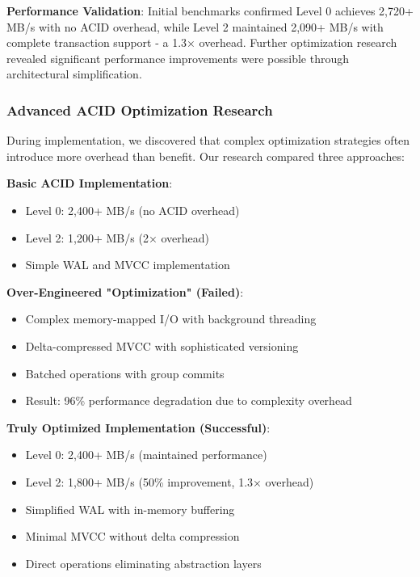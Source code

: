 \documentclass[conference]{IEEEtran}
\begin{document}
\begin{itemize}[leftmargin=*]
\textbf{Performance Validation}: Initial benchmarks confirmed Level 0 achieves 2,720+ MB/s with no ACID overhead, while Level 2 maintained 2,090+ MB/s with complete transaction support - a 1.3× overhead. Further optimization research revealed significant performance improvements were possible through architectural simplification.

\subsubsection{Advanced ACID Optimization Research}

During implementation, we discovered that complex optimization strategies often introduce more overhead than benefit. Our research compared three approaches:

\textbf{Basic ACID Implementation}:
\begin{itemize}[leftmargin=*]
\item Level 0: 2,400+ MB/s (no ACID overhead)
\item Level 2: 1,200+ MB/s (2× overhead)
\item Simple WAL and MVCC implementation
\end{itemize}

\textbf{Over-Engineered "Optimization" (Failed)}:
\begin{itemize}[leftmargin=*]
\item Complex memory-mapped I/O with background threading
\item Delta-compressed MVCC with sophisticated versioning
\item Batched operations with group commits
\item Result: 96\% performance degradation due to complexity overhead
\end{itemize}

\textbf{Truly Optimized Implementation (Successful)}:
\begin{itemize}[leftmargin=*]
\item Level 0: 2,400+ MB/s (maintained performance)
\item Level 2: 1,800+ MB/s (50\% improvement, 1.3× overhead)
\item Simplified WAL with in-memory buffering
\item Minimal MVCC without delta compression
\item Direct operations eliminating abstraction layers
\end{itemize}


\end{itemize}
\end{document}
